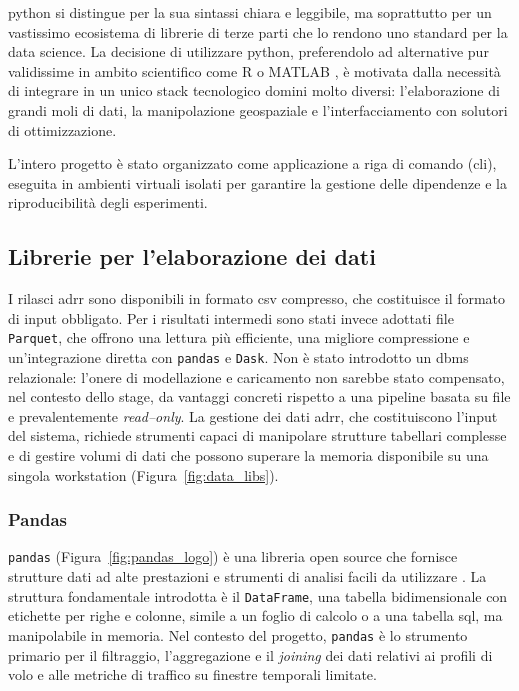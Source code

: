 \gls{python} si distingue per la sua sintassi chiara e leggibile, ma soprattutto per un vastissimo ecosistema di librerie di terze parti che lo rendono uno standard per la data science.
La decisione di utilizzare \gls{python}, preferendolo ad alternative pur validissime in ambito scientifico come R \cite{r_language} o MATLAB \cite{matlab}, è motivata dalla necessità di integrare in un unico stack tecnologico domini molto diversi: l'elaborazione di grandi moli di dati, la manipolazione geospaziale e l'interfacciamento con solutori di ottimizzazione.

L'intero progetto è stato organizzato come applicazione a riga di comando (\acrshort{cli}), eseguita in ambienti virtuali isolati per garantire la gestione delle dipendenze e la riproducibilità degli esperimenti.

\subsection{Librerie per l'elaborazione dei dati}

I rilasci \gls{adrr} sono disponibili in formato \acrshort{csv} compresso, che costituisce il formato di input obbligato. Per i risultati intermedi sono stati invece adottati file \texttt{Parquet}, che offrono una lettura più efficiente, una migliore compressione e un’integrazione diretta con \texttt{pandas} e \texttt{Dask}. Non è stato introdotto un \gls {dbms} relazionale: l’onere di modellazione e caricamento non sarebbe stato compensato, nel contesto dello stage, da vantaggi concreti rispetto a una pipeline basata su file e prevalentemente \emph{read–only}.
La gestione dei dati \gls{adrr}, che costituiscono l'input del sistema, richiede strumenti capaci di manipolare strutture tabellari complesse e di gestire volumi di dati che possono superare la memoria disponibile su una singola workstation (Figura~\ref{fig:data_libs}).

\subsubsection{Pandas}
\texttt{pandas} (Figura~\ref{fig:pandas_logo}) è una libreria \gls{open source} che fornisce strutture dati ad alte prestazioni e strumenti di analisi facili da utilizzare \cite{pandas}. La struttura fondamentale introdotta è il \texttt{DataFrame}, una tabella bidimensionale con etichette per righe e colonne, simile a un foglio di calcolo o a una tabella \acrshort{sql}, ma manipolabile in memoria.
Nel contesto del progetto, \texttt{pandas} è lo strumento primario per il filtraggio, l'aggregazione e il \emph{joining} dei dati relativi ai profili di volo e alle metriche di traffico su finestre temporali limitate.

